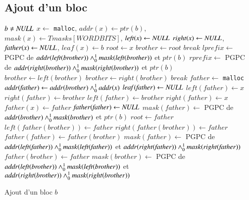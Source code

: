 \subsection{Ajout d'un bloc}


\begin{algorithm}
\begin{algorithmic}
\Require $b \neq \mathit{NULL}$
\State $\mathit{x} \gets$ \lstinline'malloc',
$\mathit{addr(x)} \gets \mathit{ptr(b)}$,
$\mathit{mask(x)} \gets \mathit{Tmasks[WORDBITS]}$,
$\mathit{left(x)} \gets \mathit{NULL}$
\State $\mathit{right(x)} \gets \mathit{NULL}$,
$\mathit{father(x)} \gets \mathit{NULL}$,
$\mathit{leaf(x)} \gets b$
  \State $\mathit{root} \gets x$
\Else
  \State $\mathit{brother} \gets \mathit{root}$
      \State $\mathit{break}$
    \EndIf
    \State $\mathit{lprefix} \gets$ PGPC de $\mathit{addr(left(brother))} \land_0^1 \mathit{mask(left(brother))}$ et $\mathit{ptr(b)}$
    \State $\mathit{rprefix} \gets$ PGPC de $\mathit{addr(right(brother))} \land_0^1 \mathit{mask(right(brother))}$ et $\mathit{ptr(b)}$
      \State $\mathit{brother} \gets \mathit{left(brother)}$
      \State $\mathit{brother} \gets \mathit{right(brother)}$
    \Else
      \State $\mathit{break}$
    \EndIf
  \EndWhile
  \State $\mathit{father} \gets$ \lstinline'malloc'
  \State $\mathit{addr(father)} \gets \mathit{addr(brother)} \land_0^1 \mathit{addr(x)}$
  \State $\mathit{leaf(father)} \gets \mathit{NULL}$
    \State $\mathit{left(father)} \gets x$
    \State $\mathit{right(father)} \gets \mathit{brother}$
  \Else
    \State $\mathit{left(father)} \gets \mathit{brother}$
    \State $\mathit{right(father)} \gets x$
  \EndIf
  \State $\mathit{father(x)} \gets \mathit{father}$
    \State $\mathit{father(father)} \gets \mathit{NULL}$
    \State $\mathit{mask(father)} \gets$ PGPC de $\mathit{addr(brother)} \land_0^1 \mathit{mask(brother)}$ et $\mathit{ptr(b)}$
    \State $\mathit{root} \gets \mathit{father}$
  \Else
      \State $\mathit{left(father(brother))} \gets \mathit{father}$
    \Else
      \State $\mathit{right(father(brother))} \gets \mathit{father}$
    \EndIf
    \State $\mathit{father(father)} \gets \mathit{father(brother)}$
    \State $\mathit{mask(father)} \gets$ PGPC de $\mathit{addr(left(father))} \land_0^1 \mathit{mask(left(father))}$ et $\mathit{addr(right(father))} \land_0^1 \mathit{mask(right(father))}$
  \EndIf
  \State $\mathit{father(brother)} \gets \mathit{father}$
    \State $\mathit{mask(brother)} \gets$ PGPC de $\mathit{addr(left(brother))} \land_0^1 \mathit{mask(left(brother))}$ et $\mathit{addr(right(brother))} \land_0^1 \mathit{mask(right(brother))}$
  \EndIf
\EndIf
\end{algorithmic}
\caption{Ajout d'un bloc $b$
  \label{algo:add-block}}
\end{algorithm}


